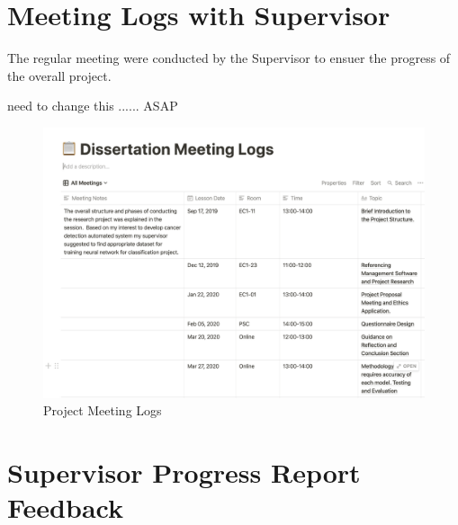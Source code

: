 \section{Meeting Logs with Supervisor}


The regular meeting were conducted by the Supervisor to ensuer the 
progress of the overall project.

need to change this ...... ASAP
\begin{figure}[!htp]
    \centering
    \includegraphics[width=15cm]{Images/meetingLogs.png}
    \caption{Project Meeting Logs}
    \label{codePRO}
\end{figure}




\pagebreak

\section{Supervisor Progress Report Feedback}
\pagebreak
